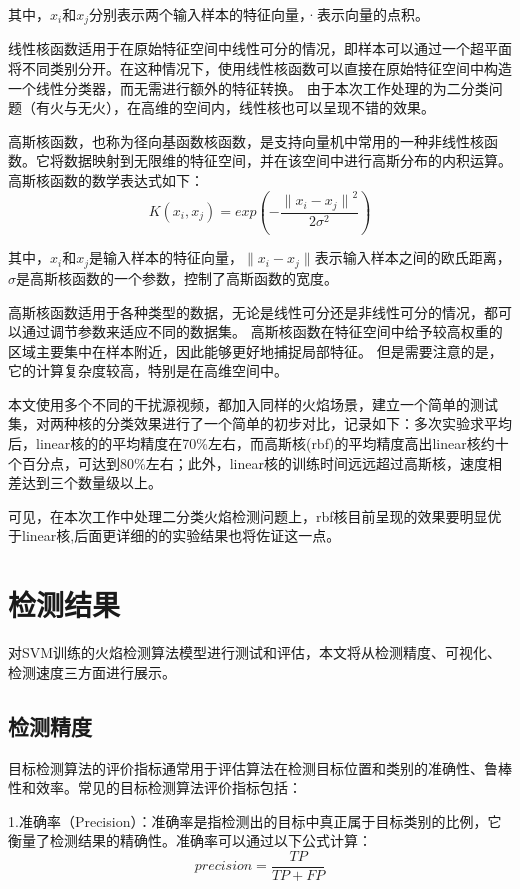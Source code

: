 其中，$x_i$和$x_j$分别表示两个输入样本的特征向量，·表示向量的点积。

线性核函数适用于在原始特征空间中线性可分的情况，即样本可以通过一个超平面将不同类别分开。在这种情况下，使用线性核函数可以直接在原始特征空间中构造一个线性分类器，而无需进行额外的特征转换。
由于本次工作处理的为二分类问题（有火与无火），在高维的空间内，线性核也可以呈现不错的效果。

高斯核函数，也称为径向基函数核函数，是支持向量机中常用的一种非线性核函数。它将数据映射到无限维的特征空间，并在该空间中进行高斯分布的内积运算。
高斯核函数的数学表达式如下：
\begin{equation} 
    K(x_i,x_j)=exp(-\frac{{\lVert x_i-x_j \rVert}^2}{2\sigma^2})
\end{equation}

其中，$x_i$和$x_j$是输入样本的特征向量，$\lVert x_i-x_j \rVert$表示输入样本之间的欧氏距离，$\sigma$是高斯核函数的一个参数，控制了高斯函数的宽度。

高斯核函数适用于各种类型的数据，无论是线性可分还是非线性可分的情况，都可以通过调节参数来适应不同的数据集。
高斯核函数在特征空间中给予较高权重的区域主要集中在样本附近，因此能够更好地捕捉局部特征。
但是需要注意的是，它的计算复杂度较高，特别是在高维空间中。

本文使用多个不同的干扰源视频，都加入同样的火焰场景，建立一个简单的测试集，对两种核的分类效果进行了一个简单的初步对比，记录如下：多次实验求平均后，linear核的的平均精度在70\%左右，而高斯核(rbf)的平均精度高出linear核约十个百分点，可达到80\%左右；此外，linear核的训练时间远远超过高斯核，速度相差达到三个数量级以上。

可见，在本次工作中处理二分类火焰检测问题上，rbf核目前呈现的效果要明显优于linear核,后面更详细的的实验结果也将佐证这一点。
\section{检测结果}
对SVM训练的火焰检测算法模型进行测试和评估，本文将从检测精度、可视化、检测速度三方面进行展示。
\subsection{检测精度}
目标检测算法的评价指标通常用于评估算法在检测目标位置和类别的准确性、鲁棒性和效率。常见的目标检测算法评价指标包括：

1.准确率（Precision）：准确率是指检测出的目标中真正属于目标类别的比例，它衡量了检测结果的精确性。准确率可以通过以下公式计算：
\begin{equation} 
    precision=\frac{TP}{TP+FP}
\end{equation}

